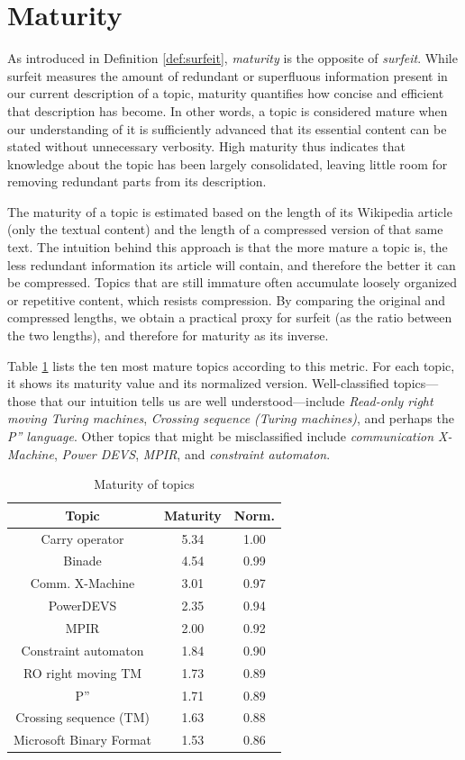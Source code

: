%
%

\section{Maturity}

As introduced in Definition \ref{def:surfeit}, \emph{maturity} is the opposite of \emph{surfeit}. While surfeit measures the amount of redundant or superfluous information present in our current description of a topic, maturity quantifies how concise and efficient that description has become. In other words, a topic is considered mature when our understanding of it is sufficiently advanced that its essential content can be stated without unnecessary verbosity. High maturity thus indicates that knowledge about the topic has been largely consolidated, leaving little room for removing redundant parts from its description.

The maturity of a topic is estimated based on the length of its Wikipedia article (only the textual content) and the length of a compressed version of that same text. The intuition behind this approach is that the more mature a topic is, the less redundant information its article will contain, and therefore the better it can be compressed. Topics that are still immature often accumulate loosely organized or repetitive content, which resists compression. By comparing the original and compressed lengths, we obtain a practical proxy for surfeit (as the ratio between the two lengths), and therefore for maturity as its inverse.

Table \ref{tab:Maturity-of-Topics} lists the ten most mature topics according to this metric. For each topic, it shows its maturity value and its normalized version. Well-classified topics—those that our intuition tells us are well understood—include \emph{Read-only right moving Turing machines}, \emph{Crossing sequence (Turing machines)}, and perhaps the \emph{P'' language}. Other topics that might be misclassified include \emph{communication X-Machine}, \emph{Power DEVS}, \emph{MPIR}, and \emph{constraint automaton}.


\begin{table}
\begin{centering}
\begin{tabular}{|c|c|c|}
\hline 
Topic & Maturity & Norm.\tabularnewline
\hline 
\hline 
Carry operator & 5.34 & 1.00\tabularnewline
\hline 
Binade & 4.54 & 0.99\tabularnewline
\hline 
Comm. X-Machine & 3.01 & 0.97\tabularnewline
\hline 
PowerDEVS & 2.35 & 0.94\tabularnewline
\hline 
MPIR & 2.00 & 0.92\tabularnewline
\hline 
Constraint automaton & 1.84 & 0.90\tabularnewline
\hline 
RO right moving TM & 1.73 & 0.89\tabularnewline
\hline 
P'' & 1.71 & 0.89\tabularnewline
\hline 
Crossing sequence (TM) & 1.63 & 0.88\tabularnewline
\hline 
Microsoft Binary Format & 1.53 & 0.86\tabularnewline
\hline 
\end{tabular}
\par\end{centering}

\caption{\label{tab:Maturity-of-Topics}Maturity of topics}
\end{table}

